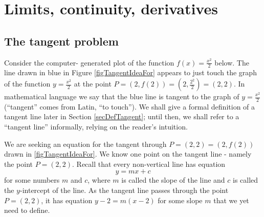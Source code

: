 \documentclass[12pt]{book}
\begin{document}
\chapter{Limits, continuity, derivatives}
\section{The tangent problem}
Consider the computer- generated plot of the function $f(x)=\frac{x^2}2$ below. The line drawn in blue in Figure \ref{figTangentIdeaFor} appears to just touch the graph of the function $y=\frac{x^2}2$ at the point $P=(2,f(2))=(2, \frac{2^2}{2}) =(2,2)$. In mathematical language we say that the blue line is tangent to the graph of $ y=\frac{x^2}2$ (``tangent'' comes from Latin, ``to touch''). We shall give a formal definition of a tangent line later in Section \ref{secDefTangent}; until then, we shall refer to a ``tangent line'' informally, relying on the reader's intuition.

We are seeking an equation for the tangent through $P=(2,2)=(2, f(2))$ drawn in \ref{figTangentIdeaFor}. We know one point on the tangent line - namely the point $P=(2,2)$. Recall that every non-vertical line has equation 
\[
y=mx+c
\]
for some numbers $m$ and $c$, where $m$ is called the slope
of the line and $c$ is called the $y$-intercept of the line. As the tangent line passes through the point $P=(2,2)$, it has equation $y-2=m(x-2)$ for some slope $m$ that we yet need to define. 
\end{document}
